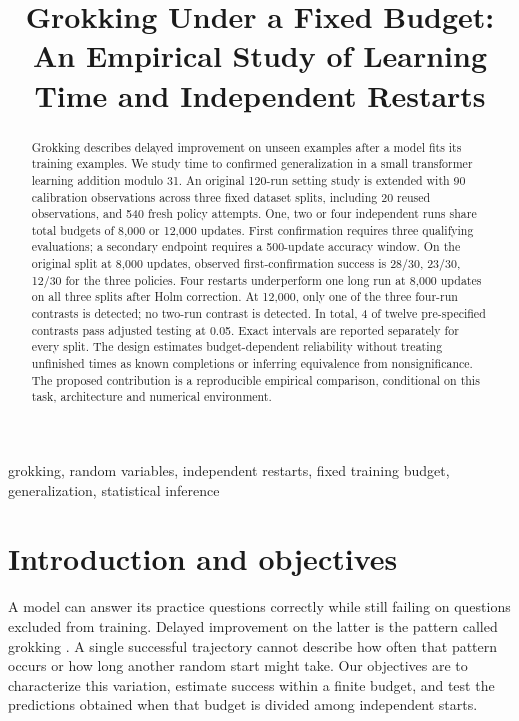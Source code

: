 \documentclass[conference,letterpaper]{IEEEtran}
\title{Grokking Under a Fixed Budget:\\An Empirical Study of Learning Time and Independent Restarts}
\author{\IEEEauthorblockN{[Your name]}
\IEEEauthorblockA{[Registration number]\\{[Department and institution]}\\BAMAT207 Probability and Statistics}}
\begin{document}
\raggedbottom
\maketitle
\begin{abstract}


Grokking describes delayed improvement on unseen examples after a model fits its training examples. We study time to confirmed generalization in a small transformer learning addition modulo 31. An original 120-run setting study is extended with 90 calibration observations across three fixed dataset splits, including 20 reused observations, and 540 fresh policy attempts. One, two or four independent runs share total budgets of 8,000 or 12,000 updates. First confirmation requires three qualifying evaluations; a secondary endpoint requires a 500-update accuracy window. On the original split at 8,000 updates, observed first-confirmation success is 28/30, 23/30, 12/30 for the three policies. Four restarts underperform one long run at 8,000 updates on all three splits after Holm correction. At 12,000, only one of the three four-run contrasts is detected; no two-run contrast is detected. In total, 4 of twelve pre-specified contrasts pass adjusted testing at 0.05. Exact intervals are reported separately for every split. The design estimates budget-dependent reliability without treating unfinished times as known completions or inferring equivalence from nonsignificance. The proposed contribution is a reproducible empirical comparison, conditional on this task, architecture and numerical environment.

\end{abstract}

\begin{IEEEkeywords}grokking, random variables, independent restarts, fixed training budget, generalization, statistical inference\end{IEEEkeywords}

\section{Introduction and objectives}

A model can answer its practice questions correctly while still failing on questions excluded from training. Delayed improvement on the latter is the pattern called grokking \cite{ref1}. A single successful trajectory cannot describe how often that pattern occurs or how long another random start might take. Our objectives are to characterize this variation, estimate success within a finite budget, and test the predictions obtained when that budget is divided among independent starts.
\end{document}
